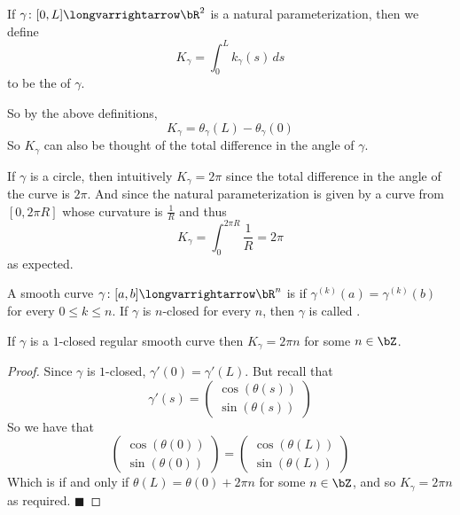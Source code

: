\documentclass[10pt]{article}
\def\pmat#1{\begin{pmatrix} #1 \end{pmatrix}}
\def\pmat#1{\begin{pmatrix}#1\end{pmatrix}}
\let\longto=\longvarrightarrow
\def\qed{%
    \ifmmode%
        \eqno\blacksquare%
    \else%
        \hskip1cm\allowbreak\hbox{}\nobreak\hfill$\blacksquare$%
    \fi%
}
\begin{document}
\begin{defn*}

    If $\gamma\colon[0,L]\longto\bR^2$ is a natural parameterization, then we define
    \[ K_\gamma = \int_0^L k_\gamma(s)\,ds \]
    to be the  of $\gamma$.

\end{defn*}

So by the above definitions,
\[ K_\gamma = \theta_\gamma(L) - \theta_\gamma(0) \]
So $K_\gamma$ can also be thought of the total difference in the angle of $\gamma$.

\begin{exam*}

    If $\gamma$ is a circle, then intuitively $K_\gamma=2\pi$ since the total difference in the angle of the curve is $2\pi$.
    And since the natural parameterization is given by a curve from $[0,2\pi R]$ whose curvature is $\frac1R$ and thus
    \[ K_\gamma = \int_0^{2\pi R}\frac1R = 2\pi \]
    as expected.

\end{exam*}

\begin{defn*}

    A smooth curve $\gamma\colon[a,b]\longto\bR^n$ is  if $\gamma^{(k)}(a)=\gamma^{(k)}(b)$ for every $0\leq k\leq n$.
    If $\gamma$ is $n$-closed for every $n$, then $\gamma$ is called .

\end{defn*}

\begin{prop*}

    If $\gamma$ is a $1$-closed regular smooth curve then $K_\gamma=2\pi n$ for some $n\in\bZ$.

\end{prop*}

\begin{proof}

    Since $\gamma$ is $1$-closed, $\gamma'(0)=\gamma'(L)$.
    But recall that
    \[ \gamma'(s) = \pmat{\cos(\theta(s))\\\sin(\theta(s))} \]
    So we have that
    \[ \pmat{\cos(\theta(0))\\\sin(\theta(0))} = \pmat{\cos(\theta(L))\\\sin(\theta(L))} \]
    Which is if and only if $\theta(L)=\theta(0)+2\pi n$ for some $n\in\bZ$, and so $K_\gamma=2\pi n$ as required.
    \qed

\end{proof}
\end{document}
